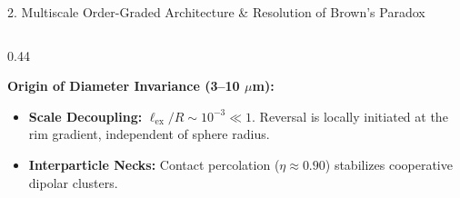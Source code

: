 \documentclass[aspectratio=169, 10pt]{beamer}
\begin{document}
\begin{frame}{2. Multiscale Order-Graded Architecture \& Resolution of Brown's Paradox}
\begin{columns}[T]
\begin{column}{0.44\textwidth}
\begin{tcolorbox}[colback=cardbg!5!white, colframe=accentgreen, title=\textbf{Quantitative Match to Experiment}, fonttitle=\scriptsize\bfseries, fontupper=\tiny]
      \textbf{Origin of Diameter Invariance (3--10 $\mu$m):}
      \begin{itemize}\setlength{\itemsep}{1pt}
        \item \textbf{Scale Decoupling:} $\ell_{\mathrm{ex}}/R \sim 10^{-3} \ll 1$. Reversal is locally initiated at the rim gradient, independent of sphere radius.
        \item \textbf{Interparticle Necks:} Contact percolation ($\eta \approx 0.90$) stabilizes cooperative dipolar clusters.
      \end{itemize}
    \end{tcolorbox}
  \end{column}
\end{columns}
\end{frame}
\end{document}
